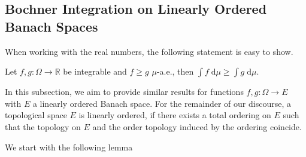 \pagebreak

\subsection{Bochner Integration on Linearly Ordered Banach Spaces}

When working with the real numbers, the following statement is easy to show.
\begin{center}
Let $f, g : \Omega \rightarrow \mathbb{R}$ be integrable and $f \ge g$ $\mu$-a.e., then $\int f\;\textrm{d} \mu \ge \int g\;\textrm{d} \mu$. 
\end{center}
In this subsection, we aim to provide similar results for functions $f, g : \Omega \rightarrow E$ with $E$ a linearly ordered Banach space. For the remainder of our discourse, a topological space $E$ is linearly ordered, if there exists a total ordering on $E$ such that the topology on $E$ and the order topology induced by the ordering coincide.

We start with the following lemma

